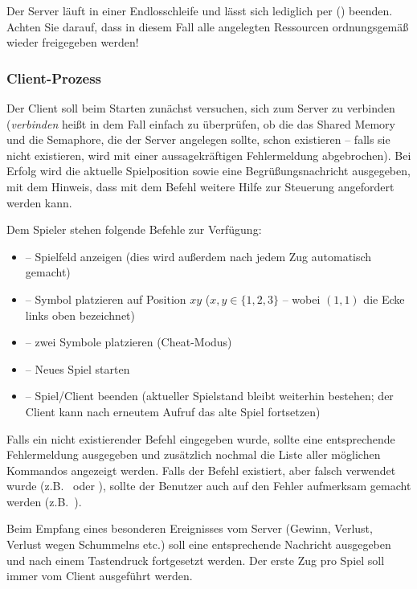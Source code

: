 Der Server läuft in einer Endlosschleife und lässt sich lediglich per
 () beenden. Achten Sie darauf, dass in
diesem Fall alle angelegten Ressourcen ordnungsgemäß wieder freigegeben werden!

\subsubsection*{Client-Prozess}
Der Client soll beim Starten zunächst versuchen, sich zum Server zu verbinden
(\emph{verbinden} heißt in dem Fall einfach zu überprüfen, ob die das Shared
Memory und die Semaphore, die der Server angelegen sollte, schon existieren --
falls sie nicht existieren, wird mit einer aussagekräftigen Fehlermeldung
abgebrochen). Bei Erfolg wird die aktuelle Spielposition sowie eine
Begrüßungsnachricht ausgegeben, mit dem Hinweis, dass mit dem Befehl 
weitere Hilfe zur Steuerung angefordert werden kann.

Dem Spieler stehen folgende Befehle zur Verfügung:

\begin{itemize}
	\item {} -- Spielfeld anzeigen (dies wird außerdem nach jedem
	                     Zug automatisch gemacht)
	\item {} -- Symbol platzieren auf Position \(xy\)
	                          (\(x, y \in \{1, 2, 3\}\) -- wobei $(1, 1)$
	                          die Ecke links oben bezeichnet)
	\item {} -- zwei Symbole platzieren (Cheat-Modus)
	\item {} -- Neues Spiel starten
	\item {} -- Spiel/Client beenden (aktueller Spielstand bleibt
	                     weiterhin bestehen; der Client kann nach erneutem
	                     Aufruf das alte Spiel fortsetzen)
\end{itemize}

Falls ein nicht existierender Befehl eingegeben wurde, sollte eine entsprechende
Fehlermeldung ausgegeben und zusätzlich nochmal die Liste aller möglichen
Kommandos angezeigt werden. Falls der Befehl existiert, aber falsch verwendet
wurde (z.B.\  oder ), sollte der Benutzer auch auf
den Fehler aufmerksam gemacht werden (z.B.\ ).

Beim Empfang eines besonderen Ereignisses vom Server (Gewinn, Verlust, Verlust
wegen Schummelns etc.) soll eine entsprechende Nachricht ausgegeben und nach
einem Tastendruck fortgesetzt werden. Der erste Zug pro Spiel soll immer vom
Client ausgeführt werden.

